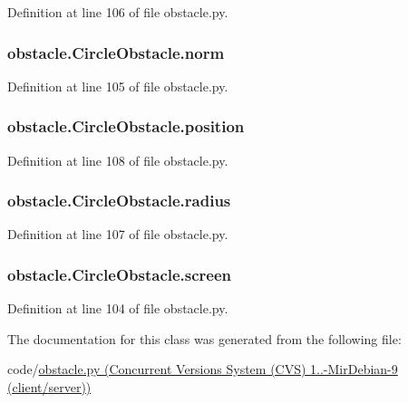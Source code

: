 Definition at line 106 of file obstacle.\-py.

\hypertarget{classobstacle_1_1CircleObstacle_a8c25cc489dbd52223b94b2eb18a1b98e}{
\subsubsection[{norm}]{\setlength{\rightskip}{0pt plus 5cm}obstacle.\-Circle\-Obstacle.\-norm}}\label{classobstacle_1_1CircleObstacle_a8c25cc489dbd52223b94b2eb18a1b98e}


Definition at line 105 of file obstacle.\-py.

\hypertarget{classobstacle_1_1CircleObstacle_aea2e66706ff3552617a8d3ad809baf84}{
\subsubsection[{position}]{\setlength{\rightskip}{0pt plus 5cm}obstacle.\-Circle\-Obstacle.\-position}}\label{classobstacle_1_1CircleObstacle_aea2e66706ff3552617a8d3ad809baf84}


Definition at line 108 of file obstacle.\-py.

\hypertarget{classobstacle_1_1CircleObstacle_a7ebababb5aa806648ee2f70897fd9872}{
\subsubsection[{radius}]{\setlength{\rightskip}{0pt plus 5cm}obstacle.\-Circle\-Obstacle.\-radius}}\label{classobstacle_1_1CircleObstacle_a7ebababb5aa806648ee2f70897fd9872}


Definition at line 107 of file obstacle.\-py.

\hypertarget{classobstacle_1_1CircleObstacle_a5930464c31645b5011c479addc56f0a1}{
\subsubsection[{screen}]{\setlength{\rightskip}{0pt plus 5cm}obstacle.\-Circle\-Obstacle.\-screen}}\label{classobstacle_1_1CircleObstacle_a5930464c31645b5011c479addc56f0a1}


Definition at line 104 of file obstacle.\-py.



The documentation for this class was generated from the following file\-:\begin{DoxyCompactItemize}
\item 
code/\hyperlink{obstacle_8py}{obstacle.\-py (\-Concurrent Versions System (\-C\-V\-S) 1..-\/\-Mir\-Debian-\/9 (client/server))}\end{DoxyCompactItemize}
